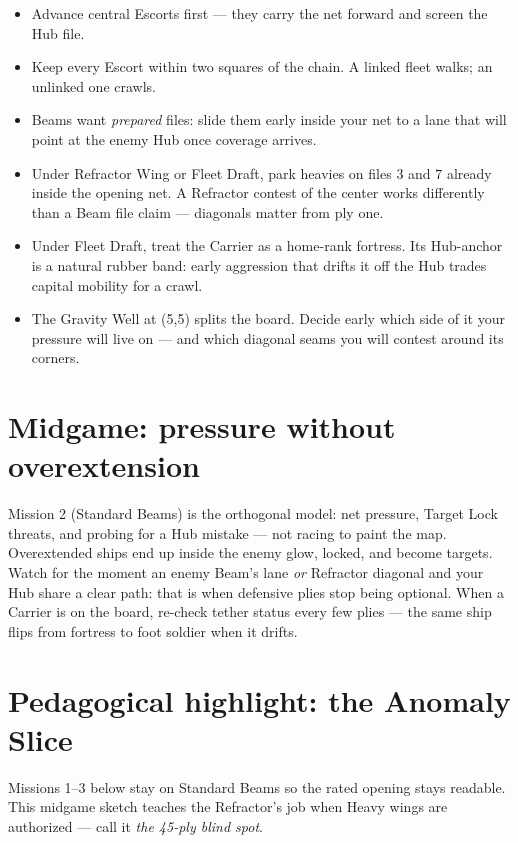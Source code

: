 \documentclass[11pt,a4paper]{article}
\begin{document}
\begin{itemize}
  \item Advance central Escorts first --- they carry the net forward and screen
        the Hub file.
  \item Keep every Escort within two squares of the chain. A linked fleet
        walks; an unlinked one crawls.
  \item Beams want \emph{prepared} files: slide them early inside your net to
        a lane that will point at the enemy Hub once coverage arrives.
  \item Under Refractor Wing or Fleet Draft, park heavies on files $3$ and $7$
        already inside the opening net. A Refractor contest of the center works
        differently than a Beam file claim --- diagonals matter from ply one.
  \item Under Fleet Draft, treat the Carrier as a home-rank fortress. Its
        Hub-anchor is a natural rubber band: early aggression that drifts it
        off the Hub trades capital mobility for a crawl.
  \item The Gravity Well at (5,5) splits the board. Decide early which side of
        it your pressure will live on --- and which diagonal seams you will
        contest around its corners.
\end{itemize}

\section{Midgame: pressure without overextension}

Mission 2 (Standard Beams) is the orthogonal model: net pressure, Target Lock
threats, and probing for a Hub mistake --- not racing to paint the map.
Overextended ships end up inside the enemy glow, locked, and become targets.
Watch for the moment an enemy Beam's lane \emph{or} Refractor diagonal and
your Hub share a clear path: that is when defensive plies stop being optional.
When a Carrier is on the board, re-check tether status every few plies --- the
same ship flips from fortress to foot soldier when it drifts.

\section{Pedagogical highlight: the Anomaly Slice}

Missions 1--3 below stay on Standard Beams so the rated opening stays
readable. This midgame sketch teaches the Refractor's job when Heavy wings
are authorized --- call it \emph{the 45-ply blind spot}.
\end{document}
